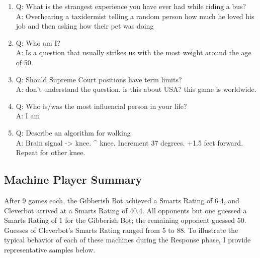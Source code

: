 \begin{enumerate}
\item Q: What is the strangest experience you have ever had while riding a bus?
\\ A: Overhearing a taxidermist telling a random person how much he loved his job and then asking how their pet was doing

\item Q: Who am I?
\\ A: Is a question that usually strikes us with the most weight around the age of 50.

\item Q: Should Supreme Court positions have term limits?
\\ A: don't understand the question. is this about USA? this game is worldwide.

\item Q: Who is/was the most influencial person in your life?
\\ A: I am

\item Q: Describe an algorithm for walking
\\ A: Brain signal -> knee. ^ knee. Increment 37 degrees. +1.5 feet forward. Repeat for other knee.
\end{enumerate}

\subsection{Machine Player Summary}

After 9 games each, the Gibberish Bot achieved a Smarts Rating of 6.4, and Cleverbot arrived at a Smarts Rating of 40.4. All opponents but one guessed a Smarts Rating of 1 for the Gibberish Bot; the remaining opponent guessed 50. Guesses of Cleverbot's Smarts Rating ranged from 5 to 88. To illustrate the typical behavior of each of these machines during the Response phase, I provide representative samples below.

